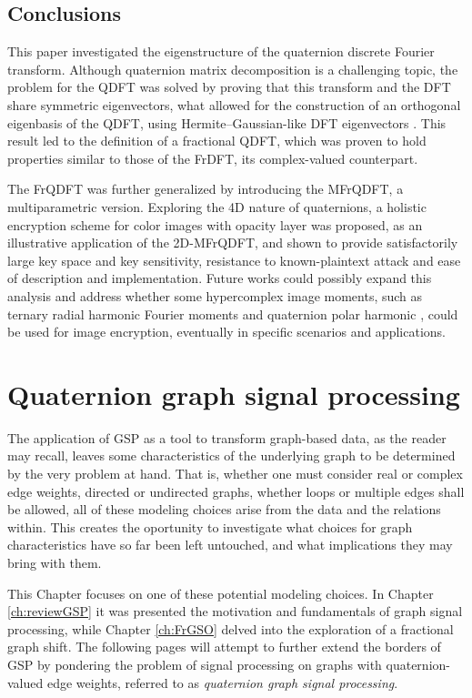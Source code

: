 \section{Conclusions}
\label{sec:conclusao}
This paper investigated the eigenstructure of the quaternion discrete Fourier transform. Although quaternion matrix decomposition is a challenging topic, the problem for the QDFT was solved by proving that this transform and the DFT share symmetric eigenvectors, what allowed for the construction of an orthogonal eigenbasis of the QDFT, using Hermite--Gaussian-like DFT eigenvectors \cite{de2017discrete}. This result led to the definition of a fractional QDFT, which was proven to hold properties similar to those of the FrDFT, its complex-valued counterpart.

The FrQDFT was further generalized by introducing the MFrQDFT, a multiparametric version. Exploring the 4D nature of quaternions, a holistic encryption scheme for color images with opacity layer was proposed, as an illustrative application of the 2D-MFrQDFT, and shown to provide satisfactorily large key space and key sensitivity, resistance to known-plaintext attack and ease of description and implementation. Future works could possibly expand this analysis and address whether some hypercomplex image moments, such as ternary radial harmonic Fourier moments and quaternion polar harmonic \cite{wang2019ternary,wang2018quaternion}, could be used for image encryption, eventually in specific scenarios and applications.


\chapter{Quaternion graph signal processing}
\label{ch:QGSP}

The application of GSP as a tool to transform graph-based data, as the reader may recall, leaves some characteristics of the underlying graph to be determined by the very problem at hand. That is, whether one must consider real or complex edge weights, directed or undirected graphs, whether loops or multiple edges shall be allowed, all of these modeling choices arise from the data and the relations within. This creates the oportunity to investigate what choices for graph characteristics have so far been left untouched, and what implications they may bring with them.

This Chapter focuses on one of these potential modeling choices. In Chapter \ref{ch:reviewGSP} it was presented the motivation and fundamentals of graph signal processing, while Chapter \ref{ch:FrGSO} delved into the exploration of a fractional graph shift. The following pages will attempt to further extend the borders of GSP by pondering the problem of signal processing on graphs with quaternion-valued edge weights, referred to as \textit{quaternion graph signal processing}.


